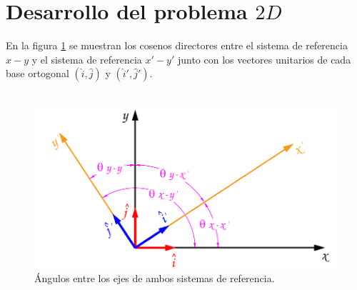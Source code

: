 \documentclass[12pt,letterpaper]{article}
\begin{document}
\section{Desarrollo del problema $2D$}
%
%
En la figura \ref{direc2d} se muestran los cosenos directores entre el sistema de referencia $x-y$ y el sistema de referencia $x'-y'$ junto con los vectores unitarios de cada base ortogonal $\left( \hat{i}, \hat{j} \right)$ y $\left( \hat{i}', \hat{j}' \right)$.\\\\
%
%
\begin{figure}[h]
	\centering
	\includegraphics[width=15cm]{img/Directores2D.pdf}
	\caption{Ángulos entre los ejes de ambos sistemas de referencia.}
	\label{direc2d}
\end{figure}
\end{document}
